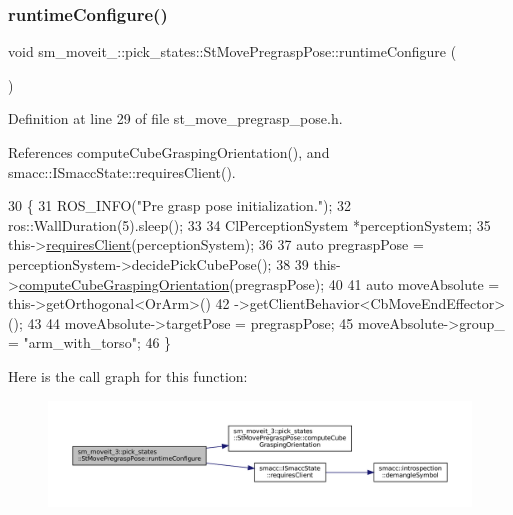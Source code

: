 \subsubsection{\texorpdfstring{runtime\+Configure()}{runtimeConfigure()}}
{\footnotesize\ttfamily void sm\+\_\+moveit\+\_\+::pick\+\_\+states\+::\+St\+Move\+Pregrasp\+Pose\+::runtime\+Configure (\begin{DoxyParamCaption}{ }\end{DoxyParamCaption})\hspace{0.3cm}{\ttfamily [inline]}}



Definition at line 29 of file st\+\_\+move\+\_\+pregrasp\+\_\+pose.\+h.



References compute\+Cube\+Grasping\+Orientation(), and smacc\+::\+I\+Smacc\+State\+::requires\+Client().


\begin{DoxyCode}
30     \{
31         ROS\_INFO(\textcolor{stringliteral}{"Pre grasp pose initialization."});
32         ros::WallDuration(5).sleep();
33 
34         ClPerceptionSystem *perceptionSystem;
35         this->\hyperlink{classsmacc_1_1ISmaccState_a7f95c9f0a6ea2d6f18d1aec0519de4ac}{requiresClient}(perceptionSystem);
36         
37         \textcolor{keyword}{auto} pregraspPose = perceptionSystem->decidePickCubePose();
38 
39         this->\hyperlink{structsm__moveit__3_1_1pick__states_1_1StMovePregraspPose_aa0d23f44ff1857dd0aa9ea0909fea7e2}{computeCubeGraspingOrientation}(pregraspPose);
40 
41         \textcolor{keyword}{auto} moveAbsolute = this->getOrthogonal<OrArm>()
42                                 ->getClientBehavior<CbMoveEndEffector>();
43 
44         moveAbsolute->targetPose = pregraspPose;
45         moveAbsolute->group\_ = \textcolor{stringliteral}{"arm\_with\_torso"};
46     \}
\end{DoxyCode}
Here is the call graph for this function\+:
\nopagebreak
\begin{figure}[H]
\begin{center}
\leavevmode
\includegraphics[width=350pt]{structsm__moveit__3_1_1pick__states_1_1StMovePregraspPose_a6b1b37e0c235bd910e5501fc8eedd705_cgraph}
\end{center}
\end{figure}
\mbox{\label{structsm__moveit__3_1_1pick__states_1_1StMovePregraspPose_ab19050a2232870f63b9a92fe1bcd3509}} 
